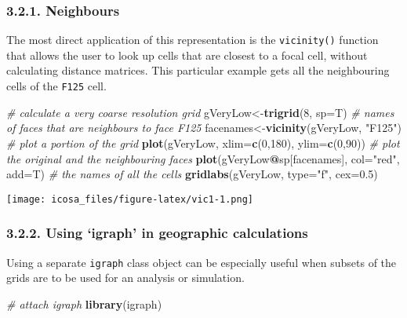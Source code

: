 \documentclass[]{article}
\newenvironment{Shaded}{\begin{snugshade}}{\end{snugshade}}
\newcommand{\KeywordTok}[1]{\textcolor[rgb]{0.13,0.29,0.53}{\textbf{#1}}}
\newcommand{\DataTypeTok}[1]{\textcolor[rgb]{0.13,0.29,0.53}{#1}}
\newcommand{\DecValTok}[1]{\textcolor[rgb]{0.00,0.00,0.81}{#1}}
\newcommand{\FloatTok}[1]{\textcolor[rgb]{0.00,0.00,0.81}{#1}}
\newcommand{\StringTok}[1]{\textcolor[rgb]{0.31,0.60,0.02}{#1}}
\newcommand{\CommentTok}[1]{\textcolor[rgb]{0.56,0.35,0.01}{\textit{#1}}}
\newcommand{\OperatorTok}[1]{\textcolor[rgb]{0.81,0.36,0.00}{\textbf{#1}}}
\newcommand{\NormalTok}[1]{#1}
\begin{document}
\subsubsection{3.2.1. Neighbours}\label{neighbours}

The most direct application of this representation is the
\texttt{vicinity()} function that allows the user to look up cells that
are closest to a focal cell, without calculating distance matrices. This
particular example gets all the neighbouring cells of the \texttt{F125}
cell.

\begin{Shaded}
\begin{Highlighting}[]
\CommentTok{# calculate a very coarse resolution grid}
\NormalTok{gVeryLow<-}\KeywordTok{trigrid}\NormalTok{(}\DecValTok{8}\NormalTok{, }\DataTypeTok{sp=}\NormalTok{T)}
\CommentTok{# names of faces that are neighbours to face F125}
\NormalTok{facenames<-}\KeywordTok{vicinity}\NormalTok{(gVeryLow, }\StringTok{"F125"}\NormalTok{)}
\CommentTok{# plot a portion of the grid}
\KeywordTok{plot}\NormalTok{(gVeryLow, }\DataTypeTok{xlim=}\KeywordTok{c}\NormalTok{(}\DecValTok{0}\NormalTok{,}\DecValTok{180}\NormalTok{), }\DataTypeTok{ylim=}\KeywordTok{c}\NormalTok{(}\DecValTok{0}\NormalTok{,}\DecValTok{90}\NormalTok{))}
\CommentTok{# plot the original and the neighbouring faces}
\KeywordTok{plot}\NormalTok{(gVeryLow}\OperatorTok{@}\NormalTok{sp[facenames], }\DataTypeTok{col=}\StringTok{"red"}\NormalTok{, }\DataTypeTok{add=}\NormalTok{T)}
\CommentTok{# the names of all the cells}
\KeywordTok{gridlabs}\NormalTok{(gVeryLow, }\DataTypeTok{type=}\StringTok{"f"}\NormalTok{, }\DataTypeTok{cex=}\FloatTok{0.5}\NormalTok{)}
\end{Highlighting}
\end{Shaded}

\texttt{[image: icosa\_files/figure-latex/vic1-1.png]}

\subsubsection{\texorpdfstring{3.2.2. Using `igraph' in geographic
calculations}{3.2.2. Using igraph in geographic calculations}}\label{using-igraph-in-geographic-calculations}

Using a separate \texttt{igraph} class object can be especially useful
when subsets of the grids are to be used for an analysis or simulation.

\begin{Shaded}
\begin{Highlighting}[]
\CommentTok{# attach igraph}
\KeywordTok{library}\NormalTok{(igraph)}
\end{Highlighting}
\end{Shaded}
\end{document}
